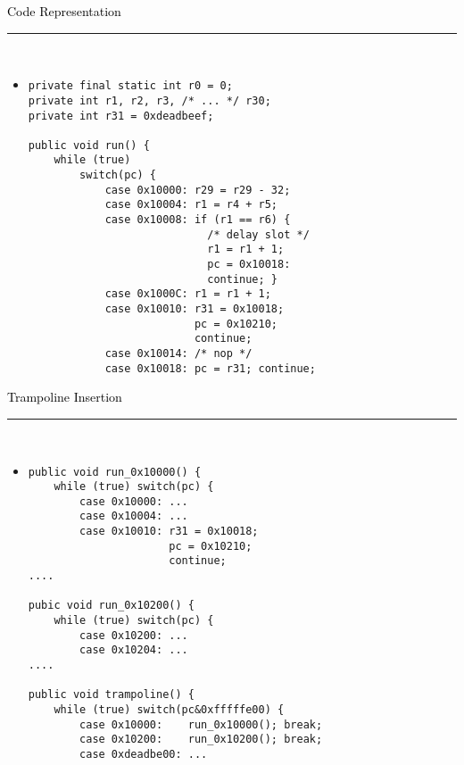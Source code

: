 \documentclass[letter]{seminar}
\begin{document}
\begin{slide}\raggedright
\renewcommand{\leftmargini}{5mm}
{\Large{\textcolor{black}{Code Representation}}}
\\\rule{\textwidth}{0.1pt}\\

\begin{itemize}

\item \vspace{5mm}



\begin{Verbatim}[fontsize=\tiny,frame=single,rulecolor=\color{CodeBorder},resetmargins=true,gobble=0]
private final static int r0 = 0;
private int r1, r2, r3, /* ... */ r30;
private int r31 = 0xdeadbeef;

public void run() {
    while (true)
        switch(pc) {
            case 0x10000: r29 = r29 - 32;
            case 0x10004: r1 = r4 + r5;
            case 0x10008: if (r1 == r6) {
                            /* delay slot */
                            r1 = r1 + 1;
                            pc = 0x10018:
                            continue; }
            case 0x1000C: r1 = r1 + 1;
            case 0x10010: r31 = 0x10018;
                          pc = 0x10210;
                          continue;
            case 0x10014: /* nop */
            case 0x10018: pc = r31; continue;
\end{Verbatim}


\end{itemize}


\end{slide}


\begin{slide}\raggedright
\renewcommand{\leftmargini}{5mm}
{\Large{\textcolor{black}{Trampoline Insertion}}}
\\\rule{\textwidth}{0.1pt}\\

\begin{itemize}

\item \vspace{5mm}



\begin{Verbatim}[fontsize=\tiny,frame=single,rulecolor=\color{CodeBorder},resetmargins=true,gobble=0]
public void run_0x10000() {
    while (true) switch(pc) {
        case 0x10000: ...
        case 0x10004: ...
        case 0x10010: r31 = 0x10018;
                      pc = 0x10210;
                      continue;
....

pubic void run_0x10200() {
    while (true) switch(pc) {
        case 0x10200: ...
        case 0x10204: ...
....

public void trampoline() {
    while (true) switch(pc&0xfffffe00) {
        case 0x10000:    run_0x10000(); break;
        case 0x10200:    run_0x10200(); break;
        case 0xdeadbe00: ...
\end{Verbatim}


\end{itemize}


\end{slide}
\end{document}
